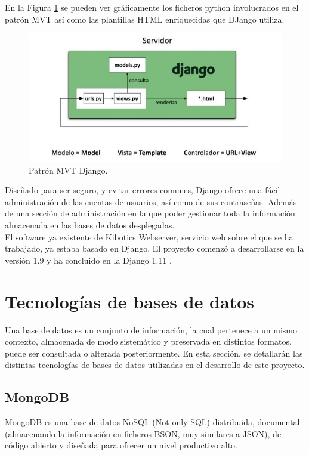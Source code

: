 \documentclass[a4paper, 12pt]{book}
\begin{document}
		En la Figura \ref{fig:MTV_Django} se pueden ver gráficamente los ficheros python involucrados en el patrón MVT así como las plantillas HTML enriquecidas que DJango utiliza.
		\begin{figure}[H]
			\centering
			\includegraphics[width=13cm, keepaspectratio]{img/django_MTV.png}
			\caption{Patrón MVT Django.}
			\label{fig:MTV_Django}
		\end{figure}
		
		Diseñado para ser seguro, y evitar errores comunes, Django ofrece una fácil administración de las cuentas de usuarios, así como de sus contraseñas. Además de una sección de administración en la que poder gestionar toda la información almacenada en las bases de datos desplegadas.\\
		
		
		El software ya existente de Kibotics Webserver, servicio web sobre el que se ha trabajado, ya estaba basado en Django. El proyecto comenzó a desarrollarse en la versión 1.9 y ha concluido en la Django 1.11  \cite{Django}.
		
	
	\section{Tecnologías de bases de datos} 
	\label{sec:tecnologias_bases_de_datos} 
		Una base de datos es un conjunto de información, la cual pertenece a un mismo contexto, almacenada de modo sistemático y preservada en distintos formatos, puede ser consultada o alterada posteriormente. En esta sección, se detallarán las distintas tecnologías de bases de datos utilizadas en el desarrollo de este proyecto.
		
	\subsection{MongoDB}
	\label{subsec:mongodb}
		MongoDB \cite{MongoDB} es una base de datos NoSQL (Not only SQL) distribuida, documental (almacenando la información en ficheros BSON, muy similares a JSON), de código abierto y diseñada para ofrecer un nivel productivo alto.\\
		
\end{document}
